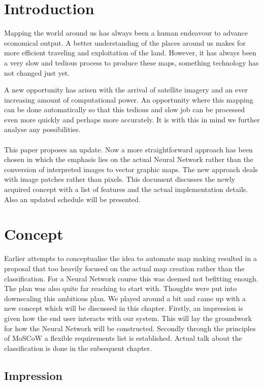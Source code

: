 \documentclass[a4paper,onecolumn]{report}
\begin{document}
\tableofcontents

\chapter{Introduction}

Mapping the world around us has always been a human endeavour to advance economical output. A better understanding of the places around us makes for more efficient traveling and exploitation of the land. However, it has always been a very slow and tedious process to produce these maps, something technology has not changed just yet.

A new opportunity has arisen with the arrival of satellite imagery and an ever increasing amount of computational power. An opportunity where this mapping can be done automatically so that this tedious and slow job can be processed even more quickly and perhaps more accurately. It is with this in mind we further analyse any possibilities.\\
\\
This paper proposes an update. Now a more straightforward approach has been chosen in which the emphasis lies on the actual Neural Network rather than the conversion of interpreted images to vector graphic maps. The new approach deals with image patches rather than pixels. This document discusses the newly acquired concept with a list of features and the actual implementation details. Also an updated schedule will be presented. 

\chapter{Concept}
Earlier attempts to conceptualise the idea to automate map making resulted in a proposal that too heavily focused on the actual map creation rather than the classification. For a Neural Network course this was deemed not befitting enough. The plan was also quite far reaching to start with. Thoughts were put into downscaling this ambitious plan. We played around a bit and came up with a new concept which will be discussed in this chapter. Firstly, an impression is given how the end user interacts with our system. This will lay the groundwork for how the Neural Network will be constructed. Secondly through the principles of MoSCoW a flexible requirements list is established. Actual talk about the classification is done in the subsequent chapter.

\section{Impression}
\end{document}
